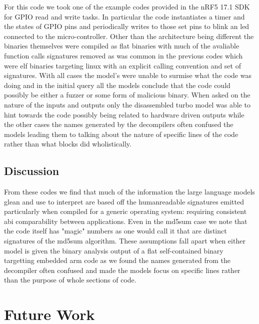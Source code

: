 For this code we took one of the example codes provided in the nRF5 17.1 SDK for GPIO read and write tasks. In particular the code instantiates a timer and the states of GPIO pins and periodically writes to those set pins to blink an led connected to the micro-controller. Other than the architecture being different the binaries themselves were compiled as flat binaries with much of the avaliable function calls signatures removed as was common in the previous codes which were elf binaries targeting linux with an explicit calling convention and set of signatures. With all cases the model's were unable to surmise what the code was doing and in the initial query all the models conclude that the code could possibly be either a fuzzer or some form of malicious binary. When asked on the nature of the inputs and outputs only the disassembled turbo model was able to hint towards the code possibly being related to hardware driven outputs while the other cases the names generated by the decompilers often confused the models leading them to talking about the nature of specific lines of the code rather than what blocks did wholistically. 

\subsection{Discussion}

From these codes we find that much of the information the large language models glean and use to interpret are based off the humanreadable signatures emitted particularly when compiled for a generic operating system: requiring consistent abi comparability between applications. Even in the md5sum case we note that the code itself has "magic" numbers as one would call it that are distinct signatures of the md5sum algorithm. These assumptions fall apart when either model is given the binary analysis output of a flat self-contained binary targetting embedded arm code as we found the names generated from the decompiler often confused and made the models focus on specific lines rather than the purpose of whole sections of code. 

\section{Future Work}

